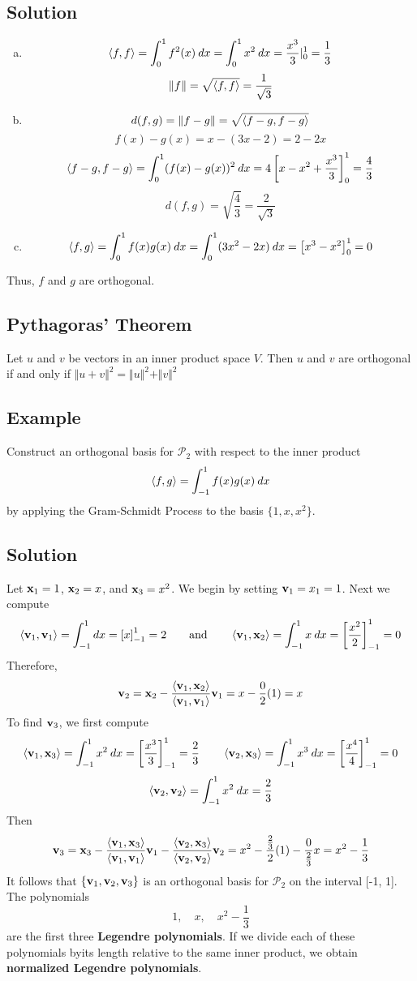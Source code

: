 \subsection*{Solution}
\begin{enumerate}[(a)]
    \item \[\ev{f,f}=\int_0^1 f^2(x)\:dx=\int_0^1 x^2\:dx=\frac{x^3}{3}|^1_0=\frac{1}{3}\]
          \[\Vert{f}\Vert=\sqrt{\ev{f,f}}=\frac{1}{\sqrt{3}}\]
    \item \[d(f,g)=\Vert{f-g}\Vert=\sqrt{\ev{f-g,f-g}}\]
          \[f(x)-g(x)=x-(3x-2)=2-2x\]
          \[\ev{f-g,f-g}=\int_0^1 (f(x)-g(x))^2\:dx=4\left[x-x^2+\frac{x^3}{3}\right]_0^1=\frac{4}{3}\]
          \[d(f,g)=\sqrt{\frac{4}{3}}=\frac{2}{\sqrt{3}}\]
    \item \[\ev{f,g}=\int_0^1 f(x)g(x)\:dx=\int_0^1(3x^2-2x)\:dx=\left[x^3-x^2\right]_0^1=0\]
\end{enumerate}
Thus, $f$ and $g$ are orthogonal.

\subsection*{Pythagoras’ Theorem}
Let $u$ and $v$ be vectors in an inner product space $V$. Then $u$ and $v$ are
orthogonal if and only if $\Vert{u + v}\Vert^2 = \Vert{u}\Vert^2 + \Vert{v}\Vert^2$

\subsection*{Example}
Construct an orthogonal basis for $\mathscr{P}_2$ with respect to the inner product
\[\ev{f,g}=\int_{-1}^1 f(x)g(x)\:dx\]
by applying the Gram-Schmidt Process to the basis $\{1,x,x^2\}$.

\subsection*{Solution}
Let $\mathbf{x}_1=1$, $\mathbf{x}_2=x$, and $\mathbf{x}_3=x^2$. We begin by setting $\mathbf{v}_1=x_1=1$. Next we compute
\[\ev{\*v_1,\*v_1}=\int_{-1}^1 dx=\left[x\right]_{-1}^1=2 \qquad \text{and} \qquad
    \ev{\*v_1,\*x_2}=\int_{-1}^1 x\:dx=\left[\frac{x^2}{2}\right]_{-1}^1=0\]
Therefore,
\[\*v_2=\*x_2-\frac{\ev{\*v_1,\*x_2}}{\ev{\*v_1,\*v_1}}\*v_1=x-\frac{0}{2}(1)=x\]
To find $\mathbf{v}_3$, we first compute
\[\ev{\*v_1,\*x_3}=\int_{-1}^1x^2\:dx=\left[\frac{x^3}{3}\right]_{-1}^1=\frac{2}{3} \qquad
    \ev{\*v_2,\*x_3}=\int_{-1}^1x^3\:dx=\left[\frac{x^4}{4}\right]_{-1}^1=0\]
\[\ev{\*v_2,\*v_2}=\int_{-1}^1x^2\:dx=\frac{2}{3}\]
Then
\[
    \*v_3=\*x_3-\frac{\ev{\*v_1,\*x_3}}{\ev{\*v_1,\*v_1}}\*v_1-\frac{\ev{\*v_2,\*x_3}}{\ev{\*v_2,\*v_2}}\*v_2=x^2-\frac{\frac{2}{3}}{2}(1)-\frac{0}{\frac{2}{3}}x=x^2-\frac{1}{3}
\]
It follows that $\{\mathbf{v}_1,\mathbf{v}_2,\mathbf{v}_3\}$ is an orthogonal basis for $\mathscr{P}_2$ on
the interval [-1, 1]. The polynomials
\[1,\quad x,\quad x^2-\frac{1}{3}\]
are the first three \textbf{Legendre polynomials}. If we divide each of these
polynomials byits length relative to the same inner product, we obtain
\textbf{normalized Legendre polynomials}.

